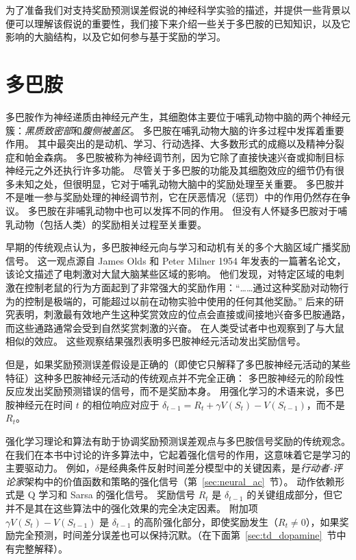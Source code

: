 为了准备我们对支持奖励预测误差假说的神经科学实验的描述，并提供一些背景以便可以理解该假说的重要性，我们接下来介绍一些关于多巴胺的已知知识，以及它影响的大脑结构，以及它如何参与基于奖励的学习。


\section{多巴胺} \label{sec:dopamine}

多巴胺作为神经递质由神经元产生，其细胞体主要位于哺乳动物中脑的两个神经元簇：\textit{黑质致密部}和\textit{腹侧被盖区}。
多巴胺在哺乳动物大脑的许多过程中发挥着重要作用。
其中最突出的是动机、学习、行动选择、大多数形式的成瘾以及精神分裂症和帕金森病。
多巴胺被称为神经调节剂，因为它除了直接快速兴奋或抑制目标神经元之外还执行许多功能。
尽管关于多巴胺的功能及其细胞效应的细节仍有很多未知之处，但很明显，它对于哺乳动物大脑中的奖励处理至关重要。
多巴胺并不是唯一参与奖励处理的神经调节剂，它在厌恶情况（惩罚）中的作用仍然存在争议。
多巴胺在非哺乳动物中也可以发挥不同的作用。
但没有人怀疑多巴胺对于哺乳动物（包括人类）的奖励相关过程至关重要。


早期的传统观点认为，多巴胺神经元向与学习和动机有关的多个大脑区域广播奖励信号。
这一观点源自 James Olds 和 Peter Milner 1954 年发表的一篇著名论文，该论文描述了电刺激对大鼠大脑某些区域的影响。
他们发现，对特定区域的电刺激在控制老鼠的行为方面起到了非常强大的奖励作用：“……通过这种奖励对动物行为的控制是极端的，可能超过以前在动物实验中使用的任何其他奖励。”\cite{olds1954positive}
后来的研究表明，刺激最有效地产生这种奖赏效应的位点会直接或间接地兴奋多巴胺通路，而这些通路通常会受到自然奖赏刺激的兴奋。
在人类受试者中也观察到了与大鼠相似的效应。
这些观察结果强烈表明多巴胺神经元活动发出奖励信号。


但是，如果奖励预测误差假设是正确的（即使它只解释了多巴胺神经元活动的某些特征）这种多巴胺神经元活动的传统观点并不完全正确：
多巴胺神经元的阶段性反应发出奖励预测错误的信号，而不是奖励本身。
用强化学习的术语来说，多巴胺神经元在时间 $ t $ 的相位响应对应于 $ \delta_{t-1} = R_t + \gamma V(S_t) - V(S_{t-1}) $，而不是 $ R_t $。


强化学习理论和算法有助于协调奖励预测误差观点与多巴胺信号奖励的传统观念。
在我们在本书中讨论的许多算法中，它起着强化信号的作用，这意味着它是学习的主要驱动力。
例如，$ \delta $是经典条件反射时间差分模型中的关键因素，是\textit{行动者-评论家}架构中的价值函数和策略的强化信号（第~\ref{sec:neural_ac}~节）。
动作依赖形式是 Q 学习和 Sarsa 的强化信号。
奖励信号 $ R_t $ 是 $ \delta_{t-1} $ 的关键组成部分，但它并不是其在这些算法中的强化效果的完全决定因素。
附加项 $ \gamma V(S_t) - V(S_{t-1}) $ 是 $ \delta_{t-1} $ 的高阶强化部分，即使奖励发生（$ R_t \neq 0 $），如果奖励完全预测，时间差分误差也可以保持沉默。（在下面第~\ref{sec:td_dopamine}~节中有完整解释）。


